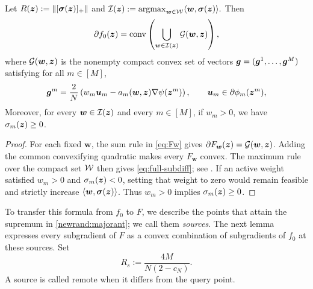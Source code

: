 \begin{lemma}
\label{lem:full-subdiff}
Let
$
 R(\bm{z}):=\left\lVert [\boldsymbol{\sigma}(\bm{z})]_+\right\rVert$ and $
 \mathcal I(\bm{z})
 :=
 \operatorname*{argmax}_{\bm{w}\in\mathcal W}
 \langle \bm{w},\boldsymbol{\sigma}(\bm{z})\rangle.
$
Then
\begin{equation}
 \partial{f_0}(\bm{z})
 =
 \operatorname{conv}
 \left(
   \bigcup_{\bm{w}\in\mathcal I(\bm{z})}
   \mathcal G(\bm{w},\bm{z})
 \right),
 \label{eq:full-subdiff}
\end{equation}
where \(\mathcal G(\bm{w},\bm{z})\) is the nonempty compact convex set of vectors
\(\bm{g}=(\bm{g}^1,\ldots,\bm{g}^M)\) satisfying for all $ m\in[M]$,
\begin{equation}
 \bm{g}^m
 =
 \frac2N
 \left(
   w_m\bm{u}_m
   -
   a_m(\bm{w}{,\bm{z}})\nabla\psi(\bm{z}^m)
 \right),
 \qquad
 \bm{u}_m\in\partial\phi_{m}(\bm{z}^m),
 \label{eq:block-subgradient}
\end{equation}
Moreover, for every \(\bm{w}\in\mathcal I(\bm{z})\) and every \(m\in[M]\), if $w_m>0$, we have
$\sigma_m(\bm{z})\geq0$.
\end{lemma}
\begin{proof}
For each fixed $\bm w$, the sum rule in \eqref{eq:Fw} gives
$\partial F_{\bm w}(\bm{z})=\mathcal G(\bm w,\bm{z})$.
Adding the common convexifying quadratic makes every
$F_{\bm w}$ convex. The maximum rule over the compact set
$\mathcal W$ then gives \eqref{eq:full-subdiff}; see
\cite[Theorem 10.31]{rockafellar2009variational}.
If an active weight satisfied $w_m>0$ and $\sigma_m(\bm{z})<0$,
setting that weight to zero would remain feasible and strictly
increase $\langle\bm w,\boldsymbol\sigma(\bm{z})\rangle$.
Thus $w_m>0$ implies $\sigma_m(\bm{z})\ge0$.\qedhere
\end{proof}



To transfer this formula from $f_0$ to $F$, we describe the points
that attain the supremum in \eqref{newrand:majorant}; we call them
\emph{sources}. The next lemma expresses every subgradient of $F$
as a convex combination of subgradients of $f_0$ at these sources.
Set
\[
 R_s:=\frac{4M}{N(2-c_N)}.
\]
A source is called remote when it differs from the query point.

